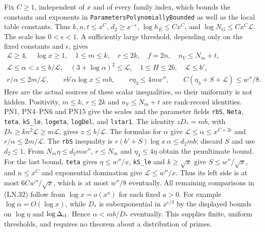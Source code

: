 Fix $C\ge1$, independent of $x$ and of every family index, which
bounds the constants and exponents in
\texttt{ParametersPolynomiallyBounded} as well as the local table
constants.  Thus $k,n,t\le x^C$, $d_2\ge x^{-\epsilon}$,
$\log h_E\le Cx^C$, and $\log N_G\le Cx^C\mathcal L$.
The scale has $0<\epsilon<1$.  A sufficiently large threshold,
depending only on the fixed constants and $\epsilon$, gives
\[
 \begin{gathered}
 \mathcal L\ge4,\quad \log x\ge1,\quad
 1\le m\le k,\quad r\le2k,\quad f=2n,\quad n_V\le N_m+t,\\
 \mathcal L\le\alpha<z\le b/\mathcal L,\quad
 (3+\log\alpha)^2\le\mathcal L,\quad
 1\le H\le2b,\quad \mathcal L\le b',\\
 r/\alpha\le2m/\mathcal L,\qquad
 rb'\alpha\log x\le mb,\qquad
 r\eta_3\le4mw'',\qquad
 C(\eta_3+S+\mathcal L)\le w''/8.
 \end{gathered}                                                   \tag{LN.32}
\]
Here are the actual sources of these scalar inequalities, so their
uniformity is not hidden.  Positivity, $m\le k$, $r\le2k$ and
$n_V\le N_m+t$ are rank-record identities.  PN1, PN4--PN6 and PN15
give the scales and the parameter fields
\texttt{rbS}, \texttt{Neta}, \texttt{teta}, \texttt{kS\_le},
\texttt{logeta}, \texttt{logDel}, and \texttt{lstar1}.
The identity $zD_*=mb$, with $D_*\ge kn^2\mathcal L\ge m\mathcal L$,
gives $z\le b/\mathcal L$.  The formulas for $\alpha$ give
$\mathcal L\le\alpha\le x^{C+2\epsilon}$ and
$r/\alpha\le2m/\mathcal L$.
The \texttt{rbS} inequality is
$r(b'+S)\log x\,\alpha\le d_2mb$; discard $S$ and use
$d_2\le1$.  From $N_m\eta\le d_2mw''$, $r\le N_m$ and
$\eta_3\le4\eta$ obtain the penultimate bound.
For the last bound, \texttt{teta} gives $\eta\le w''/x$,
\texttt{kS\_le} and $k\ge\sqrt x$ give $S\le w''/\sqrt x$,
and $n\le x^C$ and exponential domination give
$\mathcal L\le w''/x$.  Thus its left side is at most
$6Cw''/\sqrt x$, which is at most $w''/8$ eventually.
All remaining comparisons in (LN.32) follow from
$\log x=o(x^a)$ for each fixed $a>0$.  For example
$\log\alpha=O(\log x)$, while $D_*$ is subexponential in
$x^{\epsilon/3}$ by the displayed bounds on $\log\eta$ and
$\log\Delta_{\rm cl}$.  Hence $\alpha<mb/D_*$ eventually.
This supplies finite, uniform thresholds, and requires no theorem
about a distribution of primes.

